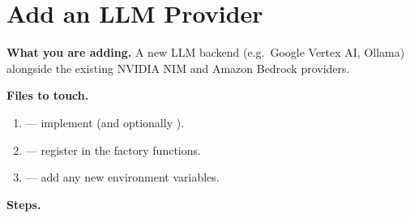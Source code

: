 \section{Add an LLM Provider}
\label{sec:add-llm-provider}

\noindent\textbf{What you are adding.}
A new LLM backend (e.g.\ Google Vertex AI, Ollama) alongside the existing
NVIDIA NIM and Amazon Bedrock providers.

\medskip\noindent\textbf{Files to touch.}

\begin{enumerate}
    \item {}
          --- implement  (and optionally
          ).
    \item {} ---
          register in the factory functions.
    \item {} --- add any new environment
          variables.
\end{enumerate}

\medskip\noindent\textbf{Steps.}

